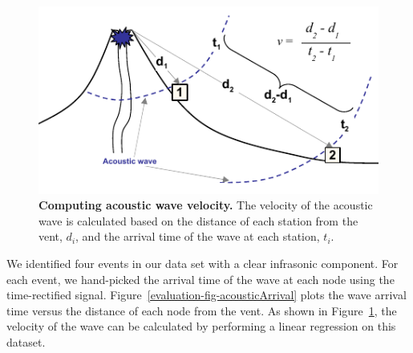 \begin{figure}[t]
\label{evaluation-fig-acousticSketch}
\begin{center}
\includegraphics[width=\hsize]{./5-evaluation/figs/fidelity/acousticSeismicSketches.pdf}
\end{center}
\caption{\textbf{Computing acoustic wave velocity.}
The velocity of the acoustic wave is calculated based on the distance of each
station from the vent, $d_i$, and the arrival time of the wave at each
station, $t_i$.}
\end{figure}

We identified four events in our data set with a clear infrasonic component.
For each event, we hand-picked the arrival time of the wave at each node
using the time-rectified signal.  Figure~\ref{evaluation-fig-acousticArrival}
plots the wave arrival time versus the distance of each node from the vent.
As shown in Figure~\ref{evaluation-fig-acousticSketch}, the velocity of the
wave can be calculated by performing a linear regression on this dataset.

